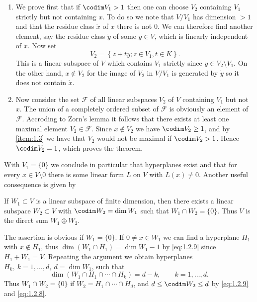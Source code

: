 \renewcommand{\thedfn}{\arabic{chapter}.\arabic{section}.\arabic{dfn}}
\begin{prf}
  \begin{enumerate}[label=\alph*),labelindent=\parindent,itemindent=!,leftmargin=0pt]
  \item\label{item:1.3}  We prove first that if $\codim V_1>1$ then one can choose
    $V_2$ containing $V_1$ strictly but not containing $x$. To do so
    we note that $V/V_1$ has dimension $>1$ and that the residue class
    $\dot{x}$ of $x$ there is not $0$. We can therefore find another
    element, say the residue class $\dot{y}$ of some $y\in V$, which
    is linearly independent of $\dot{x}$. Now set
    \begin{displaymath}
      V_2=\left\{ z+ty;z\in V_1,t\in K \right\}.
    \end{displaymath}
    This is a linear subspace of $V$ which contains $V_1$ strictly
    since $y\in V_2\setminus V_1$. On the other hand, $x\notin V_2$
    for the image of $V_2$ in $V/V_1$ is generated by $\dot{y}$ so it
    does not contain $\dot{x}$.
  \item\label{item:1.4} Now consider the set $\mathcal{F}$ of all linear subspaces
    $V_2$ of $V$ containing $V_1$ but not $x$. The union of a
    completely ordered subset of $\mathcal{F}$ is obviously an element
    of $\mathcal{F}$. Accroding to Zorn's lemma it follows that there
    exists at least one maximal element $V_2\in\mathcal{F}$. Since
    $x\notin V_2$ we have $\codim V_2\geq 1$, and by \ref{item:1.3} we have that
    $V_2$ would not be maximal if $\codim V_2>1$. Hence $\codim
    V_2=1$, which proves the theorem.
  \end{enumerate}
\end{prf}
With $V_1=\{0\}$ we conclude in particular that hyperplanes exist and
that for every $x\in V\setminus 0$ there is some linear form $L$ on
$V$ with $L(x)\neq0$. Another useful consequence is given by
\begin{cor}\label{cor:1.4.3}
  If $W_1\subset V$ is a linear subspace of finite dimension, then
  there exists a linear subspace $W_2\subset V$ with $\codim W_2=\dim
  W_1$ such that $W_1\cap W_2=\{0\}$. Thus $V$ is the direct sum
  $W_1\oplus W_2$.
\end{cor}
\begin{prf}
The assertion is obvious if $W_1=\{0\}$. If $0\neq x\in W_1$ we can
find a hyperplane $H_1$ with $x\notin H_1$, thus $\dim(W_1\cap
H_1)=\dim W_1-1$ by \eqref{eq:1.2.9} since $H_1+W_1=V$. Repeating the
argument we obtain hyperplanes $H_k,\ k=1,\ldots,d,\ d=\dim W_1$, such
that
\begin{displaymath}
  \dim(W_1\cap H_1\cap\cdots\cap H_k)=d-k,\qquad k=1,\ldots,d.
\end{displaymath}
Thus $W_1\cap W_2=\{0\}$ if $W_2=H_1\cap\cdots\cap H_d$, and
$d\leq\codim W_2\leq d$ by \eqref{eq:1.2.9} and \eqref{eq:1.2.8}.
\end{prf}
